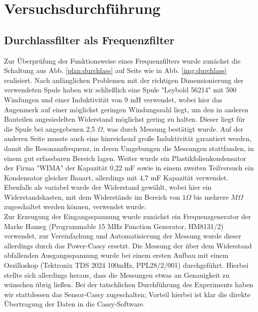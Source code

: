 \section{Versuchsdurchführung}
\subsection{Durchlassfilter als Frequenzfilter}
Zur Überprüfung der Funktionsweise eines Frequenzfilters wurde zunächst die Schaltung aus
Abb. \ref{plan:durchlass} auf Seite \pageref{plan:durchlass} wie in Abb. \ref{img:durchlass} realisiert. Nach anfänglichen Problemen mit der richtigen Dimensionierung der verwendeten Spule haben wir schließlich eine Spule "Leybold 56214" mit 500 Windungen und einer Induktivität von 9 mH verwendet, wobei hier das Augenmerk auf einer möglichst geringen Windungszahl liegt, um den in anderen Bauteilen angesiedelten Widerstand möglichst gering zu halten. Dieser liegt für die Spule bei angegebenen 2,5 $ \Omega $, was durch Messung bestätigt wurde. Auf
der anderen Seite musste auch eine hinreichend große Induktivität garantiert werden, damit die Resonanzfrequenz, in deren Umgebungen die Messungen stattfanden, in einem gut erfassbaren Bereich lagen. Weiter wurde ein Plastikfolienkondensator der Firma "WIMA" der Kapazität 0,22 mF sowie in einem zweiten Teilversuch ein Kondensator gleicher Bauart, allerdings mit 4,7 mF Kapazität verwendet. Ebenfalls als variabel wurde der Widerstand gewählt, wobei hier ein
Widerstandskasten, mit dem Widerstände im Bereich von $ 1\Omega $ bis mehrere $M \Omega $ zugeschaltet werden können, verwendet wurde. \\
Zur Erzeugung der Eingangsspannung wurde zunächst ein Frequenzgenerator der Marke Hameg (Programmable 15 MHz Function Generator, HM8131/2) verwendet, zur Vereinfachung und Automatisierung der Messung wurde dieser allerdings durch das Power-Cassy ersetzt.
Die Messung der über dem Widerstand abfallenden Ausgangsspannung wurde bei einem ersten Aufbau mit einem Oszilloskop (Tektronix TDS 2024 100mHz, PPL28/2/001) durchgeführt. Hierbei stellte sich allerdings heraus, dass die Messungen etwas an Genauigkeit zu wünschen übrig ließen. Bei der tatschlichen Durchführung des Experiments haben wir stattdessen das Sensor-Cassy zugeschalten; Vorteil hierbei ist klar die direkte Übertragung der Daten in die Cassy-Software.

